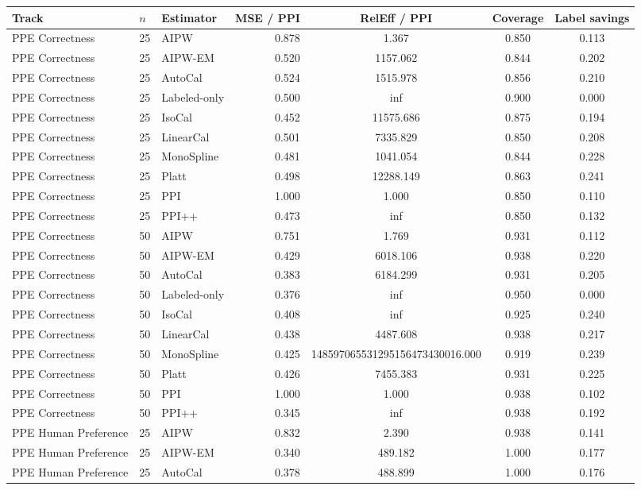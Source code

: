 \begin{tabular}{lllrccc}
\toprule
Track & $n$ & Estimator & MSE / PPI & RelEff / PPI & Coverage & Label savings \\
\midrule
PPE Correctness & 25 & AIPW & 0.878 & 1.367 & 0.850 & 0.113 \\
PPE Correctness & 25 & AIPW-EM & 0.520 & 1157.062 & 0.844 & 0.202 \\
PPE Correctness & 25 & AutoCal & 0.524 & 1515.978 & 0.856 & 0.210 \\
PPE Correctness & 25 & Labeled-only & 0.500 & inf & 0.900 & 0.000 \\
PPE Correctness & 25 & IsoCal & 0.452 & 11575.686 & 0.875 & 0.194 \\
PPE Correctness & 25 & LinearCal & 0.501 & 7335.829 & 0.850 & 0.208 \\
PPE Correctness & 25 & MonoSpline & 0.481 & 1041.054 & 0.844 & 0.228 \\
PPE Correctness & 25 & Platt & 0.498 & 12288.149 & 0.863 & 0.241 \\
PPE Correctness & 25 & PPI & 1.000 & 1.000 & 0.850 & 0.110 \\
PPE Correctness & 25 & PPI++ & 0.473 & inf & 0.850 & 0.132 \\
PPE Correctness & 50 & AIPW & 0.751 & 1.769 & 0.931 & 0.112 \\
PPE Correctness & 50 & AIPW-EM & 0.429 & 6018.106 & 0.938 & 0.220 \\
PPE Correctness & 50 & AutoCal & 0.383 & 6184.299 & 0.931 & 0.205 \\
PPE Correctness & 50 & Labeled-only & 0.376 & inf & 0.950 & 0.000 \\
PPE Correctness & 50 & IsoCal & 0.408 & inf & 0.925 & 0.240 \\
PPE Correctness & 50 & LinearCal & 0.438 & 4487.608 & 0.938 & 0.217 \\
PPE Correctness & 50 & MonoSpline & 0.425 & 148597065531295156473430016.000 & 0.919 & 0.239 \\
PPE Correctness & 50 & Platt & 0.426 & 7455.383 & 0.931 & 0.225 \\
PPE Correctness & 50 & PPI & 1.000 & 1.000 & 0.938 & 0.102 \\
PPE Correctness & 50 & PPI++ & 0.345 & inf & 0.938 & 0.192 \\
PPE Human Preference & 25 & AIPW & 0.832 & 2.390 & 0.938 & 0.141 \\
PPE Human Preference & 25 & AIPW-EM & 0.340 & 489.182 & 1.000 & 0.177 \\
PPE Human Preference & 25 & AutoCal & 0.378 & 488.899 & 1.000 & 0.176 \\

\end{tabular}
